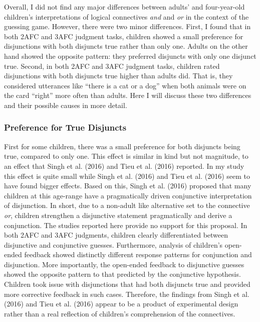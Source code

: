 \documentclass[man]{apa6}
\theoremstyle{definition}
\theoremstyle{definition}
\theoremstyle{definition}
\theoremstyle{remark}
\begin{document}
Overall, I did not find any major differences between adults' and
four-year-old children's interpretations of logical connectives
\emph{and} and \emph{or} in the context of the guessing game. However,
there were two minor differences. First, I found that in both 2AFC and
3AFC judgment tasks, children showed a small preference for disjunctions
with both disjuncts true rather than only one. Adults on the other hand
showed the opposite pattern: they preferred disjuncts with only one
disjunct true. Second, in both 2AFC and 3AFC judgment tasks, children
rated disjunctions with both disjuncts true higher than adults did. That
is, they considered utterances like \enquote{there is a cat or a dog}
when both animals were on the card \enquote{right} more often than
adults. Here I will discuss these two differences and their possible
causes in more detail.

\subsubsection{Preference for True Disjuncts}\label{conjunctive}

First for some children, there was a small preference for both disjuncts
being true, compared to only one. This effect is similar in kind but not
magnitude, to an effect that Singh et al. (2016) and Tieu et al. (2016)
reported. In my study this effect is quite small while Singh et al.
(2016) and Tieu et al. (2016) seem to have found bigger effects. Based
on this, Singh et al. (2016) proposed that many children at this
age-range have a pragmatically driven conjunctive interpretation of
disjunction. In short, due to a non-adult like alternative set to the
connective \emph{or}, children strengthen a disjunctive statement
pragmatically and derive a conjunction. The studies reported here
provide no support for this proposal. In both 2AFC and 3AFC judgments,
children clearly differentiated between disjunctive and conjunctive
guesses. Furthermore, analysis of children's open-ended feedback showed
distinctly different response patterns for conjunction and disjunction.
More importantly, the open-ended feedback to disjunctive guesses showed
the opposite pattern to that predicted by the conjunctive hypothesis.
Children took issue with disjunctions that had both disjuncts true and
provided more corrective feedback in such cases. Therefore, the findings
from Singh et al. (2016) and Tieu et al. (2016) appear to be a product
of experimental design rather than a real reflection of children's
comprehension of the connectives.
\end{document}
